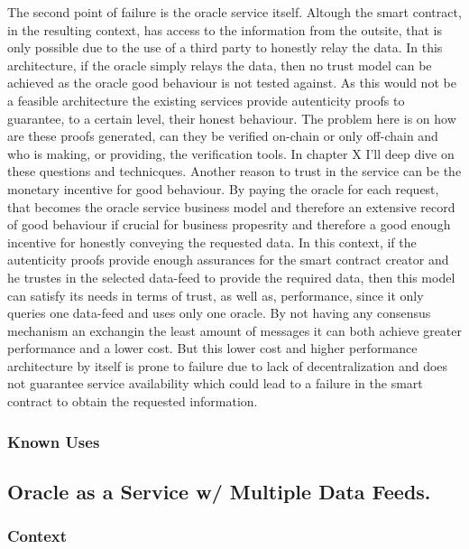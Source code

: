 The second point of failure is the oracle service itself. Altough the smart contract, in the resulting context, has access to the information from the outsite, that is only possible due to the use of a third party to honestly relay the data. In this architecture, if the oracle simply relays the data, then no trust model can be achieved as the oracle good behaviour is not tested against. As this would not be a feasible architecture the existing services provide autenticity proofs to guarantee, to a certain level, their honest behaviour. The problem here is on how are these proofs generated, can they be verified on-chain or only off-chain and who is making, or providing, the verification tools. In chapter X I'll deep dive on these questions and technicques. Another reason to trust in the service can be the monetary incentive for good behaviour. By paying the oracle for each request, that becomes the oracle service business model and therefore an extensive record of good behaviour if crucial for business propesrity and therefore a good enough incentive for honestly conveying the requested data.
In this context, if the autenticity proofs provide enough assurances for the smart contract creator and he trustes in the selected data-feed to provide the required data, then this model can satisfy its needs in terms of trust, as well as, performance, since it only queries one data-feed and uses only one oracle. By not having any consensus mechanism an exchangin the least amount of messages it can both achieve greater performance and a lower cost. But this lower cost and higher performance architecture by itself  is prone to failure due to lack of decentralization and does not guarantee service availability which could lead to a failure in the smart contract to obtain the requested information.






\subsubsection{Known Uses}

\subsection{Oracle as a Service w/ Multiple Data Feeds.}

\subsubsection{Context}
